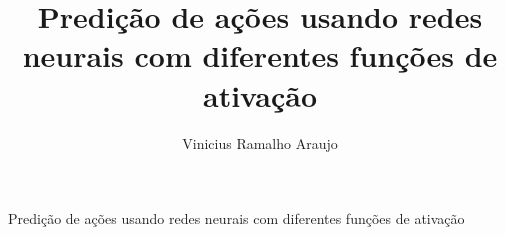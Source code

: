 \documentclass[preprint,12pt,authoryear]{elsarticle}
\begin{document}
\begin{frontmatter}





\begin{highlights}
\item Predição de ações usando redes neurais com diferentes funções de ativação
\end{highlights}


\title{Predição de ações usando redes neurais com diferentes funções de ativação}


\author[inst1]{Vinicius Ramalho Araujo}


\end{frontmatter}
\end{document}
